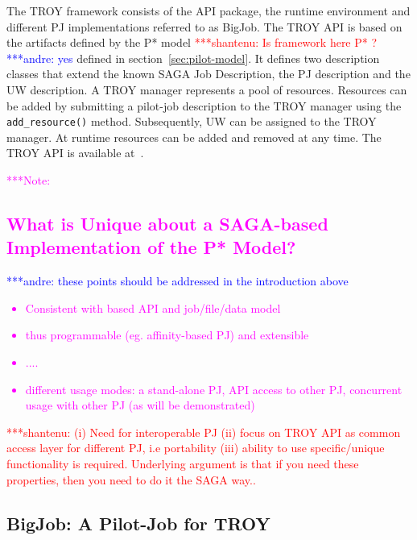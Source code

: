\documentclass[conference,final]{IEEEtran}
\newcommand{\jhanote}[1]{ {\textcolor{red} { ***shantenu: #1 }}}
\newcommand{\alnote}[1]{ {\textcolor{blue} { ***andre: #1 }}}
\newcommand{\note}[1]{ {\textcolor{magenta} { ***Note: #1 }}}
\newcommand{\alnote}[1]{}
\newcommand{\jhanote}[1]{}
\newcommand{\note}[1]{}
\newcommand{\upp}{\vspace*{-0.5em}}
\begin{document}
The TROY framework consists of the API package, the runtime environment and
different PJ implementations referred to as BigJob. The TROY API is based on the
artifacts defined by the P* model \jhanote{Is framework here P* ?}\alnote{yes} defined in
section~\ref{sec:pilot-model}. It defines two description classes that extend
the known SAGA Job Description, the PJ description and the UW description. A
TROY manager represents a pool of resources. Resources can be added by
submitting a pilot-job description to the TROY manager using the
\texttt{add\_resource()} method. Subsequently, UW can be assigned to the TROY
manager. At runtime resources can be added and removed at any time. 
The TROY API is available at~\cite{troy_api}.


 


\note{
\subsection{What is Unique about a SAGA-based Implementation of the
  P* Model?}
\alnote{these points should be addressed in the introduction above}
\begin{itemize}
\item Consistent with based API and job/file/data model
\item thus programmable (eg. affinity-based PJ) and extensible 
\item ....
\item different usage modes: a stand-alone PJ, API access to other PJ,
  concurrent usage with other PJ (as will be demonstrated)
\end{itemize}
\jhanote{(i) Need for interoperable PJ (ii) focus on TROY API as
  common access layer for different PJ, i.e portability (iii) ability
  to use specific/unique functionality is required. Underlying
  argument is that if you need these properties, then you need to do
  it the SAGA way..}
}
\subsection{BigJob: A Pilot-Job for TROY\upp\upp}
\end{document}

